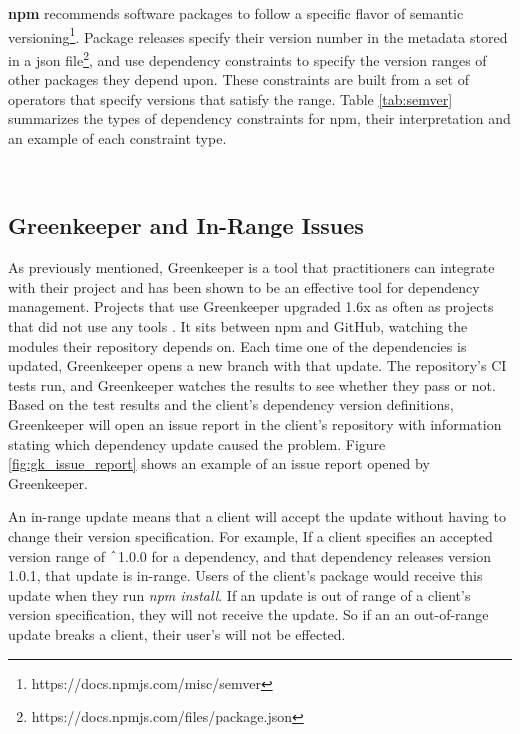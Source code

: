 \par
\textbf{npm} recommends software packages to follow a specific flavor of semantic versioning\footnote{https://docs.npmjs.com/misc/semver}. Package releases specify their version number in the metadata stored in a json file\footnote{https://docs.npmjs.com/files/package.json}, and use dependency constraints to specify the version ranges of other packages they depend upon. These constraints are built from a set of operators that specify versions that satisfy the range. Table \ref{tab:semver} summarizes the types of dependency constraints for npm, their interpretation and an example of each constraint type.

~\subsection{Greenkeeper and In-Range Issues}
\label{sec:background.greenkeeper}
As previously mentioned, Greenkeeper is a tool that practitioners can integrate with their project and has been shown to be an effective tool for dependency management. Projects that use Greenkeeper upgraded 1.6x as often as projects that did not use any tools \cite{ACM2017_Mirhosseini_AutomatedPullRequests}. It sits between npm and GitHub,  watching the modules their repository depends on. Each time one of the dependencies is updated, Greenkeeper opens a new branch with that update. The repository’s CI tests run, and Greenkeeper watches the results to see whether they pass or not. Based on the test results and the  client’s dependency version definitions, Greenkeeper will open an issue report in the client’s repository with information stating which dependency update caused the problem. Figure \ref{fig:gk_issue_report} shows an example of an issue report opened by Greenkeeper.

\par
An in-range update means that a client will accept the update without having to change their version specification. For example, If a client specifies an accepted version range of $\string^$1.0.0 for a dependency, and that dependency releases version 1.0.1, that update is in-range. Users of the client's package would receive this update when they run \textit{npm install}. If an update is out of range of a client's version specification, they will not receive the update. So if an an out-of-range update breaks a client, their user's will not be effected. 



